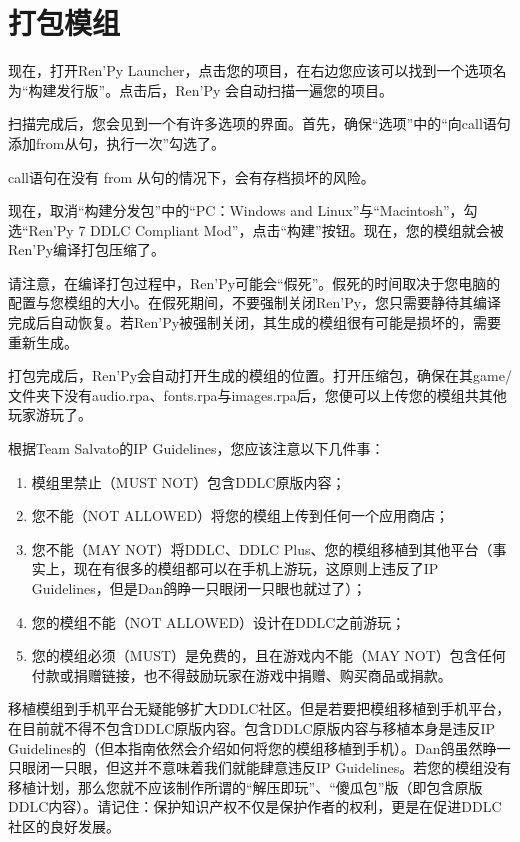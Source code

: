 \section{打包模组}
现在，打开Ren'Py Launcher，点击您的项目，在右边您应该可以找到一个选项名为“构建发行版”。点击后，Ren'Py 会自动扫描一遍您的项目。

扫描完成后，您会见到一个有许多选项的界面。首先，确保“选项”中的“向call语句添加from从句，执行一次”勾选了。
\begin{ExtraKnowledge}
    call语句在没有 from 从句的情况下，会有存档损坏的风险。
\end{ExtraKnowledge}
现在，取消“构建分发包”中的“PC：Windows and Linux”与“Macintosh”，勾选“Ren'Py 7 DDLC Compliant Mod”，点击“构建”按钮。现在，您的模组就会被Ren'Py编译打包压缩了。
\begin{Warning}
    请注意，在编译打包过程中，Ren'Py可能会“假死”。假死的时间取决于您电脑的配置与您模组的大小。在假死期间，不要强制关闭Ren'Py，您只需要静待其编译完成后自动恢复。若Ren'Py被强制关闭，其生成的模组很有可能是损坏的，需要重新生成。
\end{Warning}

打包完成后，Ren'Py会自动打开生成的模组的位置。打开压缩包，确保在其game/文件夹下没有audio.rpa、fonts.rpa与images.rpa后，您便可以上传您的模组共其他玩家游玩了。

\begin{Attention}
    根据Team Salvato的IP Guidelines，您应该注意以下几件事：
    \begin{enumerate}
        \item 模组里禁止（MUST NOT）包含DDLC原版内容；
        \item 您不能（NOT ALLOWED）将您的模组上传到任何一个应用商店；
        \item 您不能（MAY NOT）将DDLC、DDLC Plus、您的模组移植到其他平台（事实上，现在有很多的模组都可以在手机上游玩，这原则上违反了IP Guidelines，但是Dan鸽睁一只眼闭一只眼也就过了）；
        \item 您的模组不能（NOT ALLOWED）设计在DDLC之前游玩；
        \item 您的模组必须（MUST）是免费的，且在游戏内不能（MAY NOT）包含任何付款或捐赠链接，也不得鼓励玩家在游戏中捐赠、购买商品或捐款。
    \end{enumerate}
    移植模组到手机平台无疑能够扩大DDLC社区。但是若要把模组移植到手机平台，在目前就不得不包含DDLC原版内容。包含DDLC原版内容与移植本身是违反IP Guidelines的（但本指南依然会介绍如何将您的模组移植到手机）。Dan鸽虽然睁一只眼闭一只眼，但这并不意味着我们就能肆意违反IP Guidelines。若您的模组没有移植计划，那么您就不应该制作所谓的“解压即玩”、“傻瓜包”版（即包含原版DDLC内容）。请记住：保护知识产权不仅是保护作者的权利，更是在促进DDLC社区的良好发展。
\end{Attention}